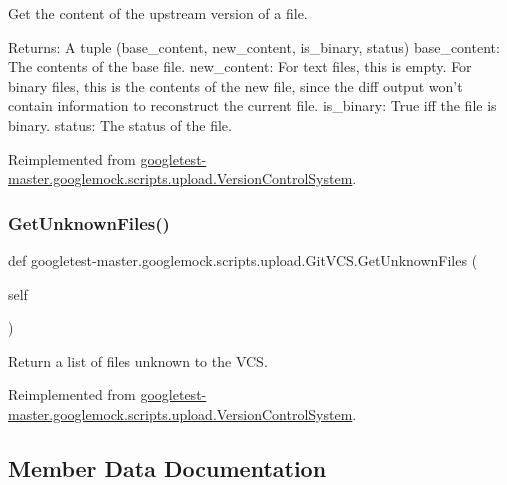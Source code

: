 \begin{DoxyVerb}Get the content of the upstream version of a file.

Returns:
  A tuple (base_content, new_content, is_binary, status)
base_content: The contents of the base file.
new_content: For text files, this is empty.  For binary files, this is
  the contents of the new file, since the diff output won't contain
  information to reconstruct the current file.
is_binary: True iff the file is binary.
status: The status of the file.
\end{DoxyVerb}
 

Reimplemented from \mbox{\hyperlink{classgoogletest-master_1_1googlemock_1_1scripts_1_1upload_1_1_version_control_system_af5a7da9e4adf46f51e6a3c077e36688d}{googletest-\/master.\+googlemock.\+scripts.\+upload.\+Version\+Control\+System}}.

\mbox{\label{classgoogletest-master_1_1googlemock_1_1scripts_1_1upload_1_1_git_v_c_s_affcaf406301de58b3b1ff4d91b2b6fae}} 
\subsubsection{\texorpdfstring{GetUnknownFiles()}{GetUnknownFiles()}}
{\footnotesize\ttfamily def googletest-\/master.\+googlemock.\+scripts.\+upload.\+Git\+V\+C\+S.\+Get\+Unknown\+Files (\begin{DoxyParamCaption}\item[{}]{self }\end{DoxyParamCaption})}

\begin{DoxyVerb}Return a list of files unknown to the VCS.\end{DoxyVerb}
 

Reimplemented from \mbox{\hyperlink{classgoogletest-master_1_1googlemock_1_1scripts_1_1upload_1_1_version_control_system_a22b33170a18fda5f1479c0be6f279dc6}{googletest-\/master.\+googlemock.\+scripts.\+upload.\+Version\+Control\+System}}.



\subsection{Member Data Documentation}
\mbox{\label{classgoogletest-master_1_1googlemock_1_1scripts_1_1upload_1_1_git_v_c_s_a6480bbb7667540b6f83b69616fb00b78}} 
